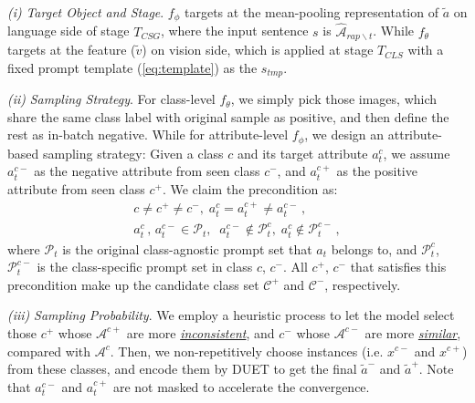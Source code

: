 \documentclass[letterpaper]{article} \usepackage{aaai23}  \usepackage{times}  \usepackage{helvet}  \usepackage{courier}  \usepackage[hyphens]{url}  \usepackage{graphicx} \urlstyle{rm} \def\UrlFont{\rm}  \usepackage{natbib}  \usepackage{caption} \frenchspacing  \setlength{\pdfpagewidth}{8.5in}  \setlength{\pdfpageheight}{11in}  \usepackage{algorithm}
\begin{document}
\textit{(i)} \textit{Target Object and Stage}. $f_\phi$ targets at the mean-pooling representation of $\tilde{a}$  on language side of stage $T_{CSG}$, where the input sentence $s$ is $\widehat{\mathcal{A}}_{rap\backslash t}$.
While $f_\theta$ targets at the feature ($\tilde{v}$) on vision side, which is applied at stage $T_{CLS}$ with a fixed prompt template (\ref{eq:template}) as the $s_{tmp}$.

\textit{(ii)} \textit{Sampling Strategy}. 
For class-level $f_\theta$, we simply pick those images, which share the same class label with original sample as positive,  and then define the rest as in-batch negative.
While for attribute-level $f_\phi$, we design {an}
attribute-based sampling strategy:
Given a class $c$ and its target attribute $a^c_{t}$, we assume $a^{c-}_{t}$ as the negative attribute from seen class $c^-$, and $a^{c+}_{t}$ as the positive attribute from seen class $c^+$. 
We claim the precondition as:
\begin{align}
    c\neq c^+\neq c^-, \;
    a^c_{t} = a^{c+}_{t} \neq a^{c-}_{t}\,, 
    \\
    a^c_{t}\,, \,a^{c-}_{t} \in \mathcal{P}_{t},\;\; 
    a^{c-}_{t} \notin \mathcal{P}_{t}^{c}, \;
    a^{c}_{t} \notin \mathcal{P}_{t}^{c-}\, ,
\end{align}
where $\mathcal{P}_{t}$ is the original {{class-agnostic}} prompt set that $a_{t}$ belongs to, and $\mathcal{P}_{t}^{c}$, $\mathcal{P}_{t}^{c-}$ is the {{class-specific}} prompt set in class $c$, $c^-$.
All $c^+$, $c^-$ that satisfies this precondition make up the candidate class set $\mathcal{C}^+$ and $\mathcal{C}^-$, respectively.

\textit{(iii)} \textit{Sampling Probability}. 
We employ a heuristic process to let the model 
select those $c^+$ whose $\mathcal{A}^{c+}$ are more \ul{\emph{inconsistent}}, and  $c^-$ whose $\mathcal{A}^{c-}$ are more \ul{\emph{similar}}, compared with $\mathcal{A}^c$. 
Then, we non-repetitively choose instances (i.e. $x^{c-}$ and $x^{c+}$) from these classes, {and} encode them by DUET to get the final $\tilde{a}^-$ and $\tilde{a}^+$.
{Note that} $a^{c-}_{t}$ and $a^{c+}_{t}$ {are not} masked to accelerate the convergence. 
\end{document}
